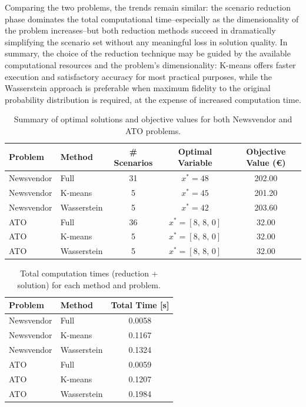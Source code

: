 \documentclass[a4paper,12pt]{article}
\begin{document}
	\noindent Comparing the two problems, the trends remain similar: the scenario reduction phase dominates the total computational time--especially as the dimensionality of the problem increases--but both reduction methods succeed in dramatically simplifying the scenario set without any meaningful loss in solution quality. In summary, the choice of the reduction technique may be guided by the available computational resources and the problem's dimensionality: K-means offers faster execution and satisfactory accuracy for most practical purposes, while the Wasserstein approach is preferable when maximum fidelity to the original probability distribution is required, at the expense of increased computation time.
	
	\begin{table}[htbp]
		\centering
		\caption{Summary of optimal solutions and objective values for both Newsvendor and ATO problems.}
		\begin{tabular}{|l|l|c|c|c|}
			\hline
			\textbf{Problem} & \textbf{Method} & \textbf{\# Scenarios} & \textbf{Optimal Variable} & \textbf{Objective Value (€)} \\
			\hline
			Newsvendor & Full           & 31 & $x^* = 48$          & 202.00 \\
			Newsvendor & K-means        & 5  & $x^* = 45$          & 201.20 \\
			Newsvendor & Wasserstein    & 5  & $x^* = 42$          & 203.60 \\
			\hline
			ATO        & Full           & 36 & $x^* = [8,\,8,\,0]$ & 32.00  \\
			ATO        & K-means        & 5  & $x^* = [8,\,8,\,0]$ & 32.00  \\
			ATO        & Wasserstein    & 5  & $x^* = [8,\,8,\,0]$ & 32.00  \\
			\hline
		\end{tabular}
		\label{tab:summary-results}
	\end{table}
	
	\begin{table}[htbp]
		\centering
		\caption{Total computation times (reduction + solution) for each method and problem.}
		\begin{tabular}{|l|l|c|}
			\hline
			\textbf{Problem} & \textbf{Method} & \textbf{Total Time [s]} \\
			\hline
			Newsvendor & Full           & 0.0058 \\
			Newsvendor & K-means        & 0.1167 \\
			Newsvendor & Wasserstein    & 0.1324 \\
			\hline
			ATO        & Full           & 0.0059 \\
			ATO        & K-means        & 0.1207 \\
			ATO        & Wasserstein    & 0.1984 \\
			\hline
		\end{tabular}
		\label{tab:summary-times}
	\end{table}
	
	
\end{document}
